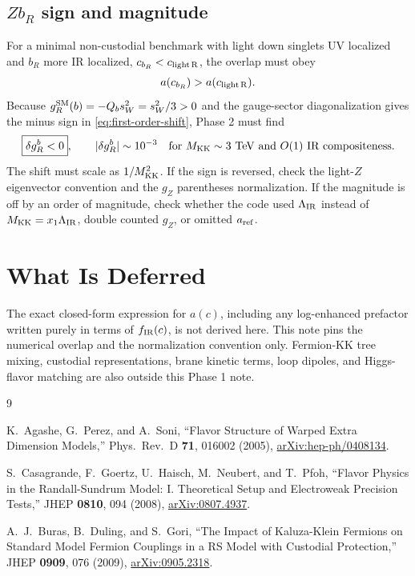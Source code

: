 \documentclass[11pt]{article}
\begin{document}
\subsection*{\texorpdfstring{\(Zb_R\)}{ZbR} sign and magnitude}

For a minimal non-custodial benchmark with light down singlets UV localized and
\(b_R\) more IR localized, \(c_{b_R}<c_{\rm light\,R}\), the overlap must obey
\begin{equation}
  a(c_{b_R}) > a(c_{\rm light\,R}).
\end{equation}
Because \(g_R^{\rm SM}(b)=-Q_b s_W^2=s_W^2/3>0\) and the gauge-sector
diagonalization gives the minus sign in \eqref{eq:first-order-shift}, Phase 2
must find
\begin{equation}
  \boxed{\delta g_R^b < 0}, \qquad
  |\delta g_R^b| \sim 10^{-3}
  \quad \text{for } M_{\rm KK}\sim 3~{\rm TeV}
  \text{ and }O(1)\text{ IR compositeness}.
\end{equation}
The shift must scale as \(1/M_{\rm KK}^2\).  If the sign is reversed, check the
light-\(Z\) eigenvector convention and the \(g_Z\) parentheses normalization.
If the magnitude is off by an order of magnitude, check whether the code used
\(\Lambda_{\rm IR}\) instead of \(M_{\rm KK}=x_1\Lambda_{\rm IR}\), double
counted \(g_Z\), or omitted \(a_{\rm ref}\).

\section{What Is Deferred}

The exact closed-form expression for \(a(c)\), including any log-enhanced
prefactor written purely in terms of \(f_{\rm IR}(c)\), is not derived here.
This note pins the numerical overlap and the normalization convention only.
Fermion-KK tree mixing, custodial representations, brane kinetic terms, loop
dipoles, and Higgs-flavor matching are also outside this Phase 1 note.

\begin{thebibliography}{9}

K.~Agashe, G.~Perez, and A.~Soni,
``Flavor Structure of Warped Extra Dimension Models,''
Phys.\ Rev.\ D \textbf{71}, 016002 (2005),
\href{https://arxiv.org/abs/hep-ph/0408134}{arXiv:hep-ph/0408134}.

S.~Casagrande, F.~Goertz, U.~Haisch, M.~Neubert, and T.~Pfoh,
``Flavor Physics in the Randall-Sundrum Model: I. Theoretical Setup and
Electroweak Precision Tests,''
JHEP \textbf{0810}, 094 (2008),
\href{https://arxiv.org/abs/0807.4937}{arXiv:0807.4937}.

A.~J.~Buras, B.~Duling, and S.~Gori,
``The Impact of Kaluza-Klein Fermions on Standard Model Fermion Couplings in a
RS Model with Custodial Protection,''
JHEP \textbf{0909}, 076 (2009),
\href{https://arxiv.org/abs/0905.2318}{arXiv:0905.2318}.

\end{thebibliography}
\end{document}
